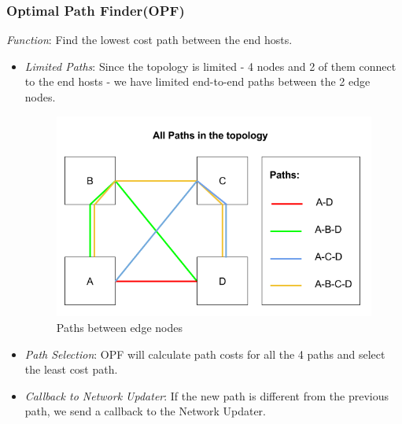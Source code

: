 \documentclass{article}
\begin{document}
\subsubsection{Optimal Path Finder(OPF)}
\textit{Function}: Find the lowest cost path between the end hosts.
\begin{itemize}
\item \textit{Limited Paths}: Since the topology is limited - 4 nodes and 2 of them connect to the end hosts - we have limited
end-to-end paths between the 2 edge nodes.
\begin{figure}[H]
\caption{Paths between edge nodes}
\centering
\includegraphics[width=\textwidth]{OPF_paths}
\end{figure}
\item \textit{Path Selection}: OPF will calculate path costs for all the 4 paths and select the least cost path.
\item \textit{Callback to Network Updater}: If the new path is different from the previous path, we send a callback to
the Network Updater.
\end{itemize}
\end{document}
